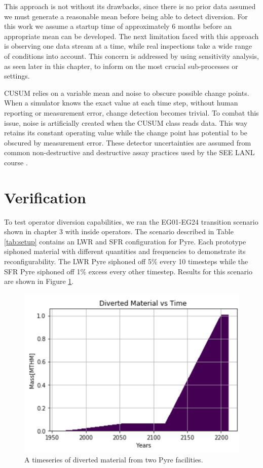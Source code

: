 This approach is not without its drawbacks, since there is no prior data assumed we must generate a reasonable mean before being able to detect diversion. For this work
we assume a startup time of approximately 6 months before an appropriate mean can be developed. The next limitation faced with this approach is observing one data stream at a time, while
real inspections take a wide range of conditions into account. This concern is addressed by using sensitivity analysis, as seen later in this chapter, to inform on the most crucial
sub-processes or settings. 

CUSUM relies on a variable mean and noise to obscure possible change points. When a simulator knows the exact value at each time step, without human reporting or measurement error, change 
detection becomes trivial. To combat this issue, noise is artificially created when the CUSUM class reads data. This way \Cyclus retains its constant operating value while the change point
has potential to be obscured by measurement error. These detector uncertainties are assumed from common non-destructive and destructive assay practices used by the SEE LANL course \cite{}.

\section{Verification}

To test operator diversion capabilities, we ran the EG01-EG24 transition scenario shown in chapter 3 with inside operators. The scenario described in Table \ref{tab:setup} contains an LWR and SFR configuration for Pyre. Each prototype siphoned material with different quantities and frequencies to demonstrate its reconfigurability. The LWR Pyre siphoned off 5\% every 10 timesteps while the SFR Pyre siphoned off 1\% excess every other timestep.  Results for this scenario are shown in
Figure \ref{fig:divertmat}.

\begin{figure}
	\centering
	\includegraphics[width=0.9\linewidth]{images/divertmat}
	\caption{A timeseries of diverted material from two Pyre facilities.}
	\label{fig:divertmat}
\end{figure}

